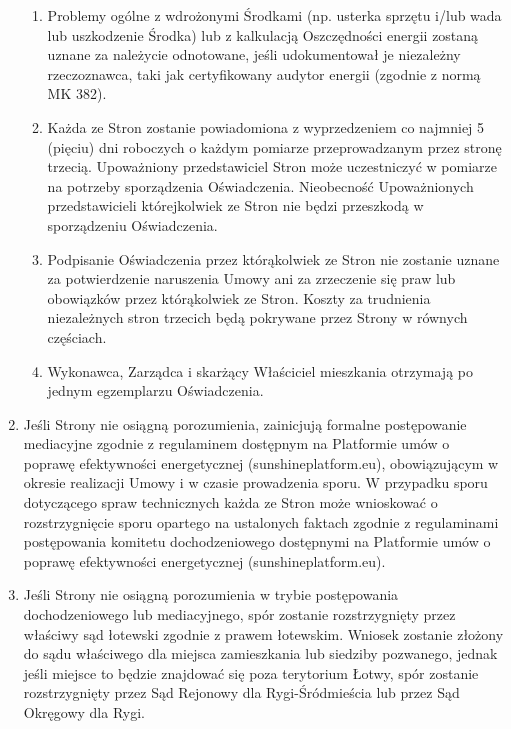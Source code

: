 \begin{multicols}{2}
\begin{enumerate}
\begin{enumerate}
		\item Problemy ogólne z wdrożonymi Środkami (np. usterka sprzętu i/lub wada lub uszkodzenie Środka) lub z kalkulacją Oszczędności energii zostaną uznane za należycie odnotowane, jeśli udokumentował je niezależny rzeczoznawca, taki jak certyfikowany audytor energii (zgodnie z normą MK 382).
		\item Każda ze Stron zostanie powiadomiona z wyprzedzeniem co najmniej 5 (pięciu) dni roboczych o każdym pomiarze przeprowadzanym przez stronę trzecią. Upoważniony przedstawiciel Stron może uczestniczyć w pomiarze na potrzeby sporządzenia Oświadczenia. Nieobecność Upoważnionych przedstawicieli którejkolwiek ze Stron nie będzi przeszkodą w sporządzeniu Oświadczenia.
		\item Podpisanie Oświadczenia przez którąkolwiek ze Stron nie zostanie uznane za potwierdzenie naruszenia Umowy ani za zrzeczenie się praw lub obowiązków przez którąkolwiek ze Stron. Koszty za trudnienia niezależnych stron trzecich będą pokrywane przez Strony w równych częściach.
		\item Wykonawca, Zarządca i skarżący Właściciel mieszkania otrzymają po jednym egzemplarzu Oświadczenia.
	\end{enumerate}
	\item Jeśli Strony nie osiągną porozumienia, zainicjują formalne postępowanie mediacyjne zgodnie z regulaminem dostępnym na Platformie umów o poprawę efektywności energetycznej (sunshineplatform.eu), obowiązującym w okresie realizacji Umowy i w czasie prowadzenia sporu. W przypadku sporu dotyczącego spraw technicznych każda ze Stron może wnioskować o rozstrzygnięcie sporu opartego na ustalonych faktach zgodnie z regulaminami postępowania komitetu dochodzeniowego dostępnymi na Platformie umów o poprawę efektywności energetycznej (sunshineplatform.eu).
	\item Jeśli Strony nie osiągną porozumienia w trybie postępowania dochodzeniowego lub mediacyjnego, spór zostanie rozstrzygnięty przez właściwy sąd łotewski zgodnie z prawem łotewskim. Wniosek zostanie złożony do sądu właściwego dla miejsca zamieszkania lub siedziby pozwanego, jednak jeśli miejsce to będzie znajdować się poza terytorium Łotwy, spór zostanie rozstrzygnięty przez Sąd Rejonowy dla Rygi-Śródmieścia lub przez Sąd Okręgowy dla Rygi.
\end{enumerate}


\end{multicols}
